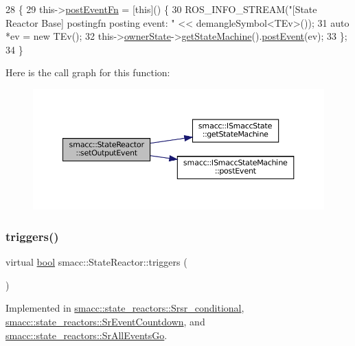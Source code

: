 \begin{DoxyCode}
28 \{
29     this->\hyperlink{classsmacc_1_1StateReactor_a1d97ae5c1689b6716c60c19c94a7eeae}{postEventFn} = [\textcolor{keyword}{this}]() \{
30         ROS\_INFO\_STREAM(\textcolor{stringliteral}{"[State Reactor Base] postingfn posting event: "} << demangleSymbol<TEv>());
31         \textcolor{keyword}{auto} *ev = \textcolor{keyword}{new} TEv();
32         this->\hyperlink{classsmacc_1_1StateReactor_aabd30af9412a8fea9ec5906f173d9d4a}{ownerState}->\hyperlink{classsmacc_1_1ISmaccState_a562bb3f9a3ac16b8be71e4794c9e7523}{getStateMachine}().\hyperlink{classsmacc_1_1ISmaccStateMachine_afcb6a216441aeaea2cba4e1ab12c366b}{postEvent}(ev);
33     \};
34 \}
\end{DoxyCode}
Here is the call graph for this function\+:
\nopagebreak
\begin{figure}[H]
\begin{center}
\leavevmode
\includegraphics[width=350pt]{classsmacc_1_1StateReactor_ae9d0dd0c8cdcc57f8881f0962040c8ed_cgraph}
\end{center}
\end{figure}
\mbox{\label{classsmacc_1_1StateReactor_a445bc3c90980d75d7d815b85cfb68b21}} 
\subsubsection{\texorpdfstring{triggers()}{triggers()}}
{\footnotesize\ttfamily virtual \hyperlink{classbool}{bool} smacc\+::\+State\+Reactor\+::triggers (\begin{DoxyParamCaption}{ }\end{DoxyParamCaption})\hspace{0.3cm}{\ttfamily [pure virtual]}}



Implemented in \hyperlink{classsmacc_1_1state__reactors_1_1Srsr__conditional_aa95877afb569902015924e5e7d1da35a}{smacc\+::state\+\_\+reactors\+::\+Srsr\+\_\+conditional}, \hyperlink{classsmacc_1_1state__reactors_1_1SrEventCountdown_aff678113dbd07339e5e3736e4aa00c81}{smacc\+::state\+\_\+reactors\+::\+Sr\+Event\+Countdown}, and \hyperlink{classsmacc_1_1state__reactors_1_1SrAllEventsGo_ab752043eda070661d2a676b580c679b7}{smacc\+::state\+\_\+reactors\+::\+Sr\+All\+Events\+Go}.



